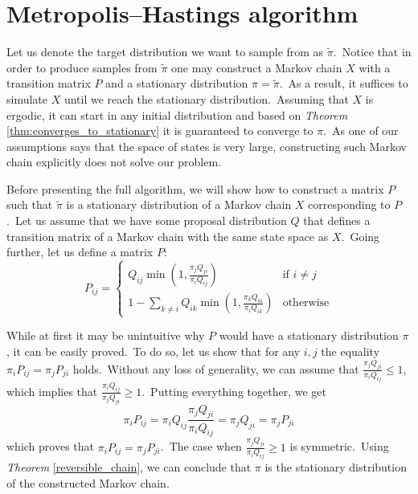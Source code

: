 \documentclass[a4paper, 11pt, onecolumn, openany, titlepage]{report}
\theoremstyle{default_theorem_style}\newtheorem{theorem}{Theorem}
\theoremstyle{default_theorem_style}\newtheorem{definition}{Definition}
\begin{document}
\section{Metropolis–Hastings algorithm}

Let us denote the target distribution we want to sample from as $\tilde{\pi}$.\ Notice that in order to produce samples
from $\tilde{\pi}$ one may construct a Markov chain $X$ with a transition matrix $P$ and a stationary distribution
$\pi = \tilde{\pi}$.\ As a result, it suffices to simulate $X$ until we reach the stationary distribution.\ Assuming
that $X$ is ergodic, it can start in any initial distribution and based on \textit{Theorem} \ref{thm:converges_to_stationary}
it is guaranteed to converge to $\pi$.\ As one of our assumptions says that the space of states is very large,
constructing such Markov chain explicitly does not solve our problem.\newline

Before presenting the full algorithm, we will show how to construct a matrix $P$ such that $\tilde{\pi}$ is a
stationary distribution of a Markov chain $X$ corresponding to $P$.\ Let us assume that we have some proposal
distribution $Q$ that defines a transition matrix of a Markov chain with the same state space as $X$.\ Going further,
let us define a matrix $P$:\newline
$$
P_{ij} =
\begin{cases}
  Q_{ij}\min{(1, \frac{\pi_j Q_{ji}}{\pi_i Q_{ij}})} &\text{if $i \ne j$}\\
  1 - \sum\limits_{k \ne i}Q_{ik} \min{(1, \frac{\pi_k Q_{ki}}{\pi_i Q_{ik}})} &\text{otherwise}
\end{cases}
$$

While at first it may be unintuitive why $P$ would have a stationary distribution $\pi$, it can be easily
proved.\ To do so, let us show that for any $i, j$ the equality $\pi_i P_{ij} = \pi_j P_{ji}$ holds.\ Without
any loss of generality, we can assume that $\frac{\pi_j Q_{ji}}{\pi_i Q_{ij}} \leq 1$, which implies that
$\frac{\pi_i Q_{ij}}{\pi_j Q_{ji}} \geq 1$.\ Putting everything together, we get
$$
\pi_i P_{ij} = \pi_i Q_{ij} \frac{\pi_j Q_{ji}}{\pi_i Q_{ij}} = \pi_j Q_{ji} = \pi_j P_{ji}
$$
which proves that $\pi_i P_{ij} = \pi_j P_{ji}$.\ The case when $\frac{\pi_j Q_{ji}}{\pi_i Q_{ij}} \geq 1$ is
symmetric.\ Using \textit{Theorem} \ref{reversible_chain}, we can conclude that $\pi$ is the stationary distribution
of the constructed Markov chain.\newline
\end{document}
